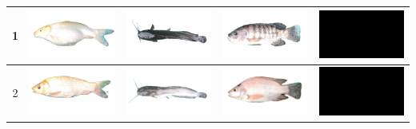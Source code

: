 \begin{longtable}{|c|c|c|c|c|}
    1 & \includegraphics[width=3cm]{gambar/emas/M01} & \includegraphics[width=3cm]{gambar/lele/L01} & \includegraphics[width=3cm]{gambar/nila/N01} & \includegraphics[width=3cm]{gambar/negative_examples/N1} \\
    \hline
    2 & \includegraphics[width=3cm]{gambar/emas/M02} & \includegraphics[width=3cm]{gambar/lele/L02} & \includegraphics[width=3cm]{gambar/nila/N02} & \includegraphics[width=3cm]{gambar/negative_examples/N2} \\
    \hline

\end{longtable}
